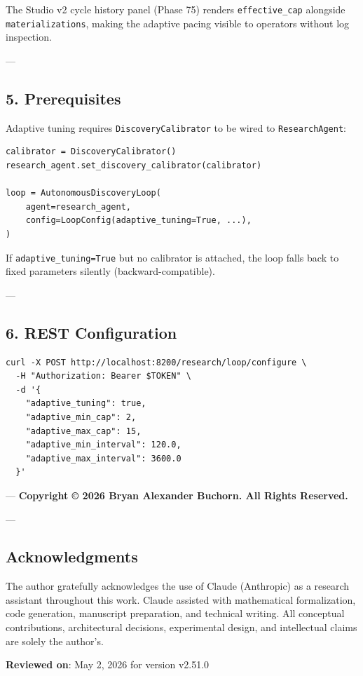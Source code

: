 The Studio v2 cycle history panel (Phase 75) renders \texttt{effective\_cap} alongside \texttt{materializations}, making the adaptive pacing visible to operators without log inspection.

---

\subsection{5. Prereq\-uisites}

Adaptive tuning requires \texttt{DiscoveryCalibrator} to be wired to \texttt{ResearchAgent}:

\begin{lstlisting}
calibrator = DiscoveryCalibrator()
research_agent.set_discovery_calibrator(calibrator)

loop = AutonomousDiscoveryLoop(
    agent=research_agent,
    config=LoopConfig(adaptive_tuning=True, ...),
)
\end{lstlisting}

If \texttt{adaptive\_tuning=True} but no calibrator is attached, the loop falls back to fixed parameters silently (backward-compatible).

---

\subsection{6. REST Config\-uration}

\begin{lstlisting}
curl -X POST http://localhost:8200/research/loop/configure \
  -H "Authorization: Bearer $TOKEN" \
  -d '{
    "adaptive_tuning": true,
    "adaptive_min_cap": 2,
    "adaptive_max_cap": 15,
    "adaptive_min_interval": 120.0,
    "adaptive_max_interval": 3600.0
  }'
\end{lstlisting}

---
\textbf{Copyright © 2026 Bryan Alexander Buchorn. All Rights Reserved.}

---
\subsection{Acknow\-ledgments}

The author gratefully ackno\-wledges the use of Claude (Anthropic) as a research assistant throughout this work. Claude assisted with mathe\-matical forma\-lization, code generation, manuscript preparation, and technical writing. All conceptual contr\-ibutions, archi\-tectural decisions, exper\-imental design, and intel\-lectual claims are solely the author's.

\textbf{Reviewed on}: May 2, 2026 for version v2.51.0
